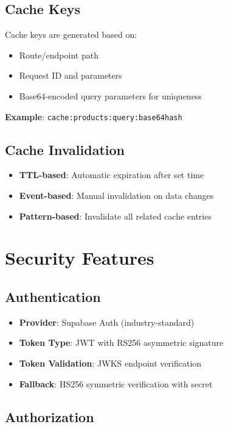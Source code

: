 \documentclass[12pt,a4paper]{report}
\begin{document}
\subsection{Cache Keys}

Cache keys are generated based on:
\begin{itemize}
    \item Route/endpoint path
    \item Request ID and parameters
    \item Base64-encoded query parameters for uniqueness
\end{itemize}

\textbf{Example}: \texttt{cache:products:query:base64hash}

\subsection{Cache Invalidation}

\begin{itemize}
    \item \textbf{TTL-based}: Automatic expiration after set time
    \item \textbf{Event-based}: Manual invalidation on data changes
    \item \textbf{Pattern-based}: Invalidate all related cache entries
\end{itemize}

\section{Security Features}

\subsection{Authentication}

\begin{itemize}
    \item \textbf{Provider}: Supabase Auth (industry-standard)
    \item \textbf{Token Type}: JWT with RS256 asymmetric signature
    \item \textbf{Token Validation}: JWKS endpoint verification
    \item \textbf{Fallback}: HS256 symmetric verification with secret
\end{itemize}

\subsection{Authorization}
\end{document}
